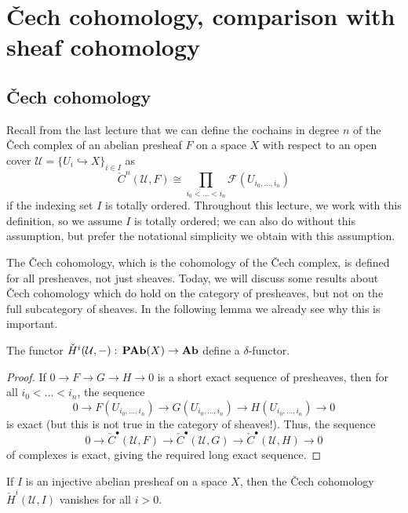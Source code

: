 \chapter{Čech cohomology, comparison with sheaf cohomology}
\label{lecture:17}

\section{Čech cohomology}
\noindent
Recall from the last lecture that we can define the cochains in degree \(n\) of the Čech complex of an abelian presheaf \(F\) on a space \(X\) with respect to an open cover \(\mathcal U=\{U_i\hookrightarrow X\}_{i\in I}\) as
\[ \check{C}^n(\mathcal U,F) \cong \prod_{i_0<\ldots<i_n}\mathcal F(U_{i_0,\ldots,i_n}) \]
if the indexing set \(I\) is totally ordered.
Throughout this lecture, we work with this definition, so we assume \(I\) is totally ordered; we can also do without this assumption, but prefer the notational simplicity we obtain with this assumption.

The Čech cohomology, which is the cohomology of the Čech complex, is defined for all presheaves, not just sheaves.
Today, we will discuss some results about Čech cohomology which do hold on the category of presheaves, but not on the full subcategory of sheaves.
In the following lemma we already see why this is important.

\begin{lem}
The functor \(\check{H}^i(\mathcal U,-)\colon\catAbelianPresheaf(X)\to\catAbelianGroup\) define a \(\delta\)-functor.
\end{lem}
\begin{proof}
If \(0\to F\to G\to H\to 0\) is a short exact sequence of presheaves, then for all \(i_0<\ldots<i_n\), the sequence
\[ 0 \to F(U_{i_0,\ldots,i_n}) \to G(U_{i_0,\ldots,i_n}) \to H(U_{i_0,\ldots,i_n}) \to 0 \]
is exact (but this is not true in the category of sheaves!).
Thus, the sequence
\[ 0 \to \check{C}^\bullet(\mathcal U,F) \to \check{C}^\bullet(\mathcal U,G) \to \check{C}^\bullet(\mathcal U,H)\to 0 \]
of complexes is exact, giving the required long exact sequence.
\end{proof}

\begin{thm}\label{thm:Čech-chomology-vanishes-injective-presheaf}
If \(I\) is an injective abelian presheaf on a space \(X\), then the Čech cohomology \(\check{H}^i(\mathcal U,I)\) vanishes for all \(i>0\).
\end{thm}

